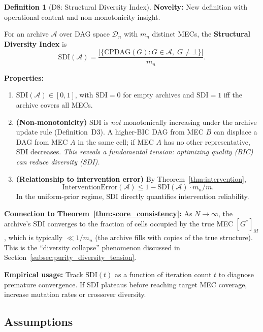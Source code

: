 \documentclass{article}
\theoremstyle{definition}
\newtheorem{definition}{Definition}
\theoremstyle{plain}
\theoremstyle{remark}
\begin{document}
\begin{definition}[D8: Structural Diversity Index]
\label{def:sdi}
\textbf{Novelty:} New definition with operational content and non-monotonicity insight.

For an archive $\mathcal{A}$ over DAG space $\mathcal{D}_n$ with $m_n$ distinct
MECs, the \textbf{Structural Diversity Index} is
\begin{equation}
\mathrm{SDI}(\mathcal{A}) = \frac{|\{\mathrm{CPDAG}(G) : G \in \mathcal{A},\;
G \neq \bot\}|}{m_n}.
\end{equation}

\textbf{Properties:}
\begin{enumerate}
  \item[(i)] $\mathrm{SDI}(\mathcal{A}) \in [0, 1]$, with $\mathrm{SDI} = 0$ for
    empty archives and $\mathrm{SDI} = 1$ iff the archive covers all MECs.
  \item[(ii)] \textbf{(Non-monotonicity)} SDI is \emph{not} monotonically increasing under the archive
    update rule (Definition~D3). A higher-BIC DAG from MEC $B$ can displace a DAG
    from MEC $A$ in the same cell; if MEC $A$ has no other representative, SDI decreases.
    \emph{This reveals a fundamental tension: optimizing quality (BIC) can reduce
    diversity (SDI).}
  \item[(iii)] \textbf{(Relationship to intervention error)} By
    Theorem~\ref{thm:intervention},
    \begin{equation}
      \mathrm{InterventionError}(\mathcal{A}) \leq 1 - \mathrm{SDI}(\mathcal{A}) \cdot m_n / m.
    \end{equation}
    In the uniform-prior regime, SDI directly quantifies intervention reliability.
\end{enumerate}

\textbf{Connection to Theorem~\ref{thm:score_consistency}:} As $N \to \infty$, the
archive's SDI converges to the fraction of cells occupied by the true MEC $[G^*]_M$,
which is typically $\ll 1/m_n$ (the archive fills with copies of the true structure).
This is the ``diversity collapse'' phenomenon discussed in Section~\ref{subsec:purity_diversity_tension}.

\textbf{Empirical usage:} Track SDI$(t)$ as a function of iteration count $t$ to
diagnose premature convergence. If SDI plateaus before reaching target MEC coverage,
increase mutation rates or crossover diversity.
\end{definition}


\subsection{Assumptions}
\label{sec:assumptions}
\end{document}
